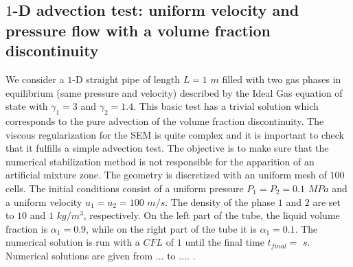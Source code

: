 \subsection{$1$-D advection test: uniform velocity and pressure flow with a volume fraction discontinuity}\label{sec:1d-advection-7-eq-sct4}
We consider a $1$-D straight pipe of length $L=1$ $m$ filled with two gas phases in equilibrium (same pressure and velocity) described by the Ideal Gas equation of state with $\gamma_1 = 3$ and $\gamma_2 = 1.4$. This basic test has a trivial solution which corresponds to the pure advection of the volume fraction discontinuity. The viscous regularization for the SEM is quite complex and it is important to check that it fulfills a simple advection test. The objective is to make sure that the numerical stabilization method is not responsible for the apparition of an artificial mixture zone. The geometry is discretized with an uniform mesh of $100$ cells. The initial conditions consist of a uniform pressure $P_1 = P_2 =0.1$ $MPa$ and a uniform velocity $u_1 = u_2 = 100$ $m/s$. The density of the phase $1$ and $2$ are set to $10$ and $1$ $kg/m^3$, respectively. On the left part of the tube, the liquid volume fraction is $\alpha_{1} = 0.9$, while on the right part of the tube it is $\alpha_{1} = 0.1$. The numerical solution is run with a $CFL$ of $1$ until the final time $t_{final} = $ $s$. Numerical solutions are given from ... to .... .
%
